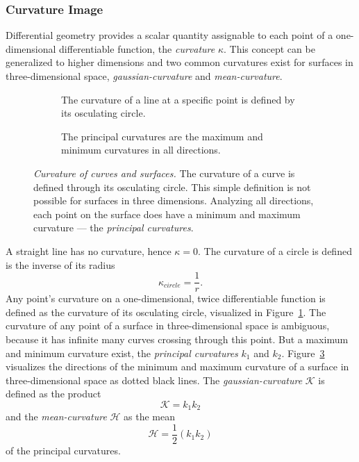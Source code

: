 \subsubsection{Curvature Image}

Differential geometry provides a scalar quantity assignable to each point of a one-dimensional differentiable function, the \emph{\gls{curvature}} $\kappa$\cite[p. 10]{Kuhnel2008}.
This concept can be generalized to higher dimensions and two common \glspl{curvature} exist for surfaces in three-dimensional space, \emph{\gls{gaussian-curvature}} and \emph{\gls{mean-curvature}}.
\begin{figure}[t]
    \begin{subfigure}[t]{0.48\textwidth}
        \centering
        \scalebox{0.85}{%
        
        }
        \caption{The \gls{curvature} of a line at a specific point is defined by its osculating circle.}\label{fig:osculating_circle}
    \end{subfigure}\hfill%
    \begin{subfigure}[t]{0.48\textwidth}
        \centering
        \scalebox{0.85}{%
        
        }
        \caption{The principal curvatures are the maximum and minimum \glspl{curvature} in all directions.}\label{fig:curvature_surface}
    \end{subfigure}
    \caption[Curvature of curves and surfaces]{\emph{Curvature of curves and surfaces.} The \gls{curvature} of a curve is defined through its osculating circle. This simple definition is not possible for surfaces in three dimensions. Analyzing all directions, each point on the surface does have a minimum and maximum \gls{curvature} --- the \emph{principal curvatures}.}
\end{figure}
A straight line has no \gls{curvature}, hence $\kappa = 0$.
The \gls{curvature} of a circle is defined is the inverse of its radius
\begin{equation}
    \kappa_{circle} = \frac{1}{r}\text{.}
\end{equation}
Any point's \gls{curvature} on a one-dimensional, twice differentiable function is defined as the \gls{curvature} of its osculating circle, visualized in Figure~\ref{fig:osculating_circle}.
The \gls{curvature} of any point of a surface in three-dimensional space is ambiguous, because it has infinite many curves crossing through this point.
But a maximum and minimum \gls{curvature} exist, the \emph{principal curvatures} $k_1$ and $k_2$.
Figure~\ref{fig:curvature_surface} visualizes the directions of the minimum and maximum \gls{curvature} of a surface in three-dimensional space as dotted black lines.
The \emph{\Gls{gaussian-curvature}} $\mathcal{K}$ is defined as the product
\begin{equation}
    \mathcal{K} = k_1 k_2
\end{equation}
and the \emph{\gls{mean-curvature}} $\mathcal{H}$ as the mean
\begin{equation}
    \mathcal{H} = \frac{1}{2} (k_1 k_2)
\end{equation}
of the principal curvatures.


